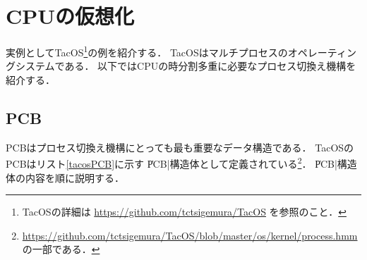 \chapter{CPUの仮想化}
\label{tacosVirtualCPU}
実例としてTacOS\footnote{TacOSの詳細は
  \url{https://github.com/tctsigemura/TacOS}
  を参照のこと．}の例を紹介する．
TacOSはマルチプロセスのオペレーティングシステムである．
以下ではCPUの時分割多重に必要なプロセス切換え機構を紹介する．

\section{PCB}
PCBはプロセス切換え機構にとっても最も重要なデータ構造である．
TacOSのPCBはリスト\ref{tacosPCB}に示す
\|PCB|構造体として定義されている\footnote{
  \url{https://github.com/tctsigemura/TacOS/blob/master/os/kernel/process.hmm}
  の一部である．}．
\|PCB|構造体の内容を順に説明する．



